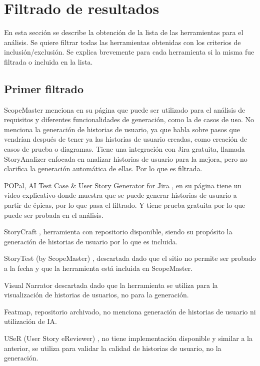\section{Filtrado de resultados}

En esta sección se describe la obtención de la lista de las herramientas para el análisis. Se quiere filtrar todas las herramientas obtenidas con los criterios de inclusión/exclusión. Se explica brevemente para cada herramienta si la misma fue filtrada o incluida en la lista.

\subsection{Primer filtrado}
ScopeMaster \cite{scopemaster} menciona en su página que puede ser utilizado para el análisis de requisitos y diferentes funcionalidades de generación, como la de casos de uso. No menciona la generación de historias de usuario, ya que habla sobre pasos que vendrían después de tener ya las historias de usuario creadas, como creación de casos de prueba o diagramas.
Tiene una integración con Jira gratuita, llamada StoryAnalizer \cite{storyanalizer}
enfocada en analizar historias de usuario para la mejora, pero no clarifica la generación automática de ellas. Por lo que es filtrada.

POPal, AI Test Case \& User Story Generator for Jira \cite{popal}, en su página tiene un video explicativo donde muestra que se puede generar historias de usuario a partir de épicas, por lo que pasa el filtrado. Y tiene prueba gratuita por lo que puede ser probada en el análisis.

StoryCraft \cite{storycraft}, herramienta con repositorio disponible, siendo su propósito la generación de historias de usuario por lo que es incluida.

StoryTest (by ScopeMaster) \cite{storytest}, descartada dado que el sitio no permite ser probado a la fecha y que la herramienta está incluida en ScopeMaster.

Visual Narrator \cite{visualnarrator} descartada dado que la herramienta se utiliza para la visualización de historias de usuarios, no para la generación.

Featmap, \cite{featmap} repositorio archivado, no menciona generación de historias de usuario ni utilización de IA.

USeR (User Story eReviewer) \cite{user}, no tiene implementación disponible y similar a la anterior, se utiliza para validar la calidad de historias de usuario, no la generación.

